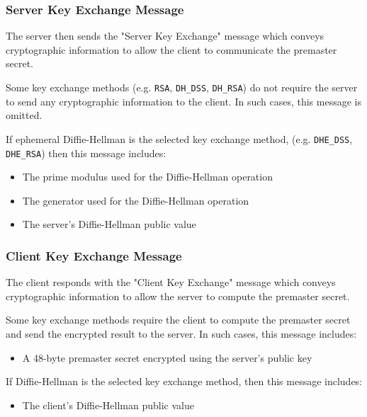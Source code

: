 \documentclass[aspectratio=169]{beamer}
\begin{document}
\begin{frame}[roundel=siiblue]
	\frametitle{Server Key Exchange Message}	
	The server then sends the "Server Key Exchange" message which conveys cryptographic information to allow the client to communicate the premaster secret.
	
	\vfill
	
		Some key exchange methods (e.g. \texttt{RSA},  \texttt{DH\_DSS}, \texttt{DH\_RSA}) do not require the server to send any cryptographic information to the client.  In such cases, this message is omitted.

	\vfill
	
	If ephemeral Diffie-Hellman is the selected key exchange method, (e.g. \texttt{DHE\_DSS}, \texttt{DHE\_RSA})  then this message includes:
	\begin{itemize}
		\item The prime modulus used for the Diffie-Hellman operation
		\item The generator used for the Diffie-Hellman operation
		\item The server's Diffie-Hellman public value
	\end{itemize}
	
\end{frame}

\begin{frame}[roundel=siiblue]
	\frametitle{Client Key Exchange Message}
	The client responds with the "Client Key Exchange" message which conveys cryptographic information to allow the server to compute the premaster secret.
	
	\vfill	
	
	Some key exchange methods require the client to compute the premaster secret and send the encrypted result to the server. In such cases, this message includes:
	\begin{itemize}
		\item A 48-byte premaster secret encrypted using the server's public key
	\end{itemize}
	
	\vfill	
	
	If Diffie-Hellman is the selected key exchange method, then this message includes:
	\begin{itemize}
		\item The client's Diffie-Hellman public value	
	\end{itemize}

\end{frame}
\end{document}
